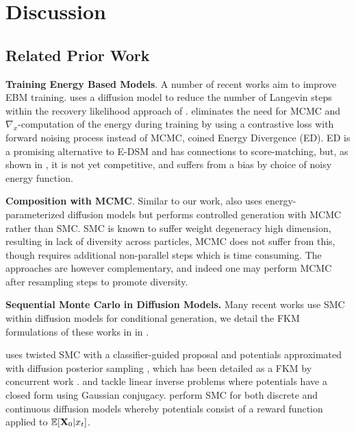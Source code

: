 \section{Discussion}

\subsection{Related Prior Work}

\textbf{Training Energy Based Models}.
A number of recent works aim to improve EBM training. \citet{zhu2023learning} uses a diffusion model to reduce the number of Langevin steps within the recovery likelihood approach of \cite{gao2020learning}. \cite{schroder2024energy} eliminates the need for MCMC and $\nabla_x$-computation of the energy during training by using a contrastive loss with forward noising process instead of MCMC, coined Energy Divergence (ED). ED is a promising alternative to E-DSM and has connections to score-matching, but, as shown in , it is not yet competitive, and  suffers from a bias by choice of noisy energy function.

\textbf{Composition with MCMC}. Similar to our work, \cite{du2023reduce} also uses energy-parameterized diffusion models but performs controlled generation with MCMC rather than SMC. SMC is known to suffer weight degeneracy high dimension, resulting in lack of diversity across particles, MCMC does not suffer from this, though requires additional non-parallel steps which is time consuming. The approaches are however complementary, and indeed one may perform MCMC after resampling steps to promote diversity.

\textbf{Sequential Monte Carlo in Diffusion Models.}
Many recent works use SMC within diffusion models for conditional generation, we detail the FKM formulations of these works in in .

\cite{wu2024practical} uses twisted SMC with a classifier-guided proposal \citep{dhariwal2021diffusion} and potentials approximated with diffusion posterior sampling \citep{chungdiffusion}, which has been detailed as a FKM by concurrent work \citep{zhao2024conditional}. \cite{cardoso2024monte} and \cite{dou2024diffusion} tackle linear inverse problems where potentials have a closed form using Gaussian conjugacy. \cite{li2024derivative} perform SMC for both discrete and continuous diffusion models whereby potentials consist of a reward function applied to $\mathbb{E}[\mathbf{X}_0|x_t]$.

